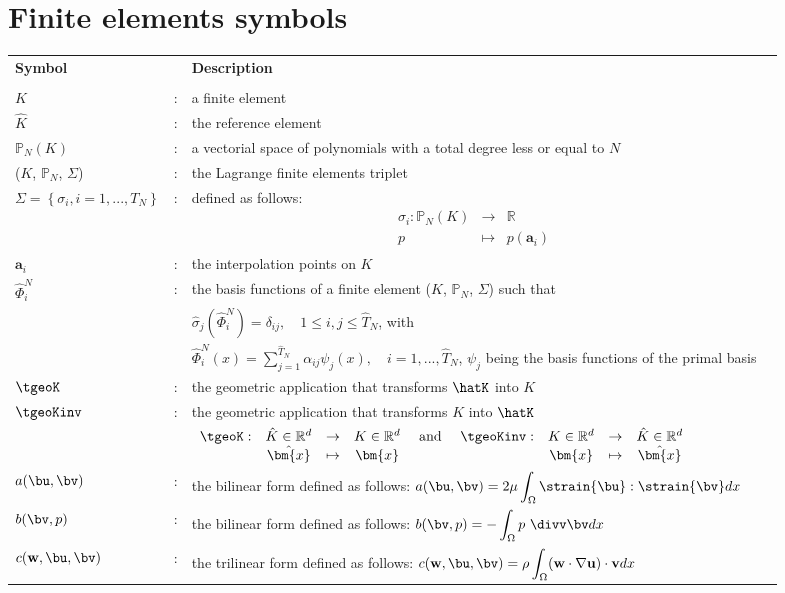 \section*{Finite elements symbols}
\vspace{-6mm}
\begin{longtable}{lcp{}l}
  \textbf{Symbol} & & \textbf{Description} \\
   & & & \\
    $K$ & : & a finite element & \\
    $\hat{K}$ & : & the reference element & \\
    $\mathbb{P}_{N}(K)$ & : & a vectorial space of polynomials with a total degree less or equal to $N$ & \\
   ($K$, $\mathbb{P}_{N}$, $\Sigma$) & : & the Lagrange finite elements triplet &\\
   $\Sigma = \left\{\sigma_{i}, i=1,...,T_N \right\}$ & : & defined as follows:  \begin{eqnarray*}
  \sigma_{i} :\mathbb{P}_{N}(K) &\longrightarrow &\mathbb{R} \\
  p &\longmapsto &p\left(\bm{a}_{i}\right)
\end{eqnarray*} & \\
    $\bm{a}_i$ & : & the interpolation points on $K$ & \\
    $\hat{\Phi}^N_{i}$  & : & the basis functions of a finite element ($K$, $\mathbb{P}_{N}$, $\Sigma$) such that & \\
   & & $ \hat{\sigma}_{j}\left(\hat{\Phi}^N_{i}\right) = \delta_{ij} , \quad 1 \leq i,j \leq \hat{T}_N $, with &\\
   & & $\hat{\Phi}^N_{i}\left(x\right) = \sum_{j=1}^{\hat{T}_N} \alpha_{ij} \psi_{j} \left(x\right) , \quad  i=1,...,\hat{T}_N$, $\psi_{j}$ being the basis functions of the primal basis &\\
    $\tgeoK$ & : &  the geometric application that transforms $\hatK$ into $K$ &\\
    $\tgeoKinv$ & : & the geometric application that transforms $K$ into $\hatK$ &\\
    && $\begin{array}{ccccccccc}
\tgeoK : & \hat{K} \in \mathbb{R}^{d}& \rightarrow & K\in \mathbb{R}^{d} &   \ \text{and}  
\ \  \ \ \tgeoKinv : & K \in \mathbb{R}^{d}& \rightarrow & \hat{K} \in \mathbb{R}^{d} & \\
 &\hat{\bm{x}} & \mapsto &  \bm{x} &  & \bm{x} & \mapsto &  \hat{\bm{x}} & \\
 \end{array}$\\
 $a(\bu,\bv)$ & : & the bilinear form defined as follows: $\displaystyle a(\bu,\bv) = 2\mu\int_\Omega \strain{\bu}:\strain{\bv} dx$ &\\
  $b(\bv,p)$ & : & the bilinear form defined as follows: $\displaystyle b(\bv,p)  =  - \int_\Omega p\ \divv\bv dx$ &\\
 $c(\mathbf{w},\bu,\bv)$ & : & the trilinear form defined as follows: $\displaystyle c(\mathbf{w},\bu,\bv)  =  \rho \int_\Omega (\mathbf{w} \cdot \nabla \mathbf{u}) \cdot \mathbf{v} dx$ &\\
\end{longtable}   
   
